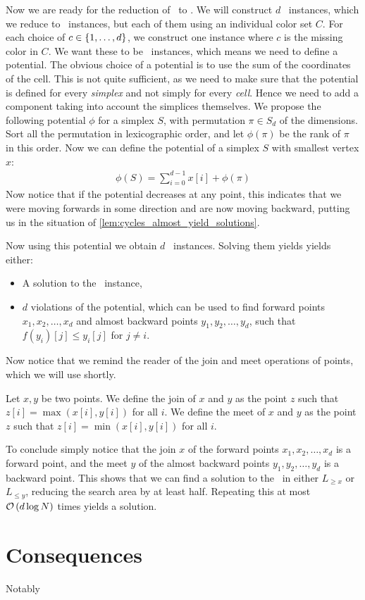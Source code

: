 Now we are ready for the reduction of \Tarskistar\ to \EndOfPotentialLine. We will construct $d$ \Tarskistar\ instances, which we reduce to \EndOfLine\ instances, but each of them using an individual color set $C$. For each choice of $c \in \left\{1, \dots, d\right\}$, we construct one instance where $c$ is the missing color in $C$. We want these to be \EndOfPotentialLine\ instances, which means we need to define a potential. The obvious choice of a potential is to use the sum of the coordinates of the cell. This is not quite sufficient, as we need to make sure that the potential is defined for every \emph{simplex} and not simply for every \emph{cell}. Hence we need to add a component taking into account the simplices themselves. We propose the following potential $\phi$ for a simplex $S$, with permutation $\pi \in S_d$ of the dimensions. Sort all the permutation in lexicographic order, and let $\phi(\pi)$ be the rank of $\pi$ in this order. Now we can define the potential of a simplex $S$ with smallest vertex $x$:
\begin{align*}
	\phi(S) = \sum_{i=0}^{d-1} x[i] + \phi(\pi)
\end{align*}
Now notice that if the potential decreases at any point, this indicates that we were moving forwards in some direction and are now moving backward, putting us in the situation of \cref{lem:cycles_almost_yield_solutions}.

Now using this potential we obtain $d$ \EndOfPotentialLine\ instances. Solving them yields yields either:
\begin{itemize}
	\item A solution to the \Tarskistar\ instance,
	\item $d$ violations of the potential, which can be used to find forward points $x_1, x_2, \dots, x_d$ and almost backward points $y_1, y_2, \dots, y_d$, such that $f(y_i)[j] \leq y_i[j]$ for $j \neq i$.
\end{itemize}
Now notice that we remind the reader of the join and meet operations of points, which we will use shortly.
\begin{definition}
	Let $x, y$ be two points. We define the join of $x$ and $y$ as the point $z$ such that $z[i] = \max(x[i], y[i])$ for all $i$. We define the meet of $x$ and $y$ as the point $z$ such that $z[i] = \min(x[i], y[i])$ for all $i$.
\end{definition}
To conclude simply notice that the join $x$ of the forward points $x_1, x_2, \dots, x_d$ is a forward point, and the meet $y$ of the almost backward points $y_1, y_2, \dots, y_d$ is a backward point. This shows that we can find a solution to the \Tarskistar\ in either $L_{\geq x}$ or $L_{\leq y}$, reducing the search area by at least half. Repeating this at most $\mathcal{O}\left(d\log{N}\right)$ times yields a solution.

\section{Consequences}

Notably 